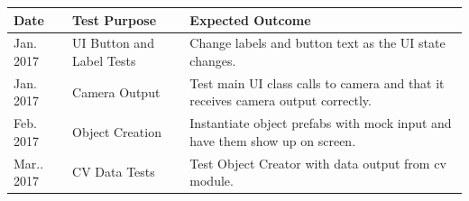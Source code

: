 \documentclass[12pt]{article}
\begin{document}
\begin{longtable}[]{@{}lll@{}}
\toprule
\begin{minipage}[b]{0.06\columnwidth}\raggedright\strut
Date\strut
\end{minipage} & \begin{minipage}[b]{0.16\columnwidth}\raggedright\strut
Test Purpose\strut
\end{minipage} & \begin{minipage}[b]{0.22\columnwidth}\raggedright\strut
Expected Outcome\strut
\end{minipage}\tabularnewline
\midrule
\endhead
\begin{minipage}[t]{0.06\columnwidth}\raggedright\strut
Jan. 2017\strut
\end{minipage} & \begin{minipage}[t]{0.16\columnwidth}\raggedright\strut
UI Button and Label Tests\strut
\end{minipage} & \begin{minipage}[t]{0.22\columnwidth}\raggedright\strut
Change labels and button text as the UI state changes.\strut
\end{minipage}\tabularnewline
\begin{minipage}[t]{0.06\columnwidth}\raggedright\strut
Jan. 2017\strut
\end{minipage} & \begin{minipage}[t]{0.16\columnwidth}\raggedright\strut
Camera Output\strut
\end{minipage} & \begin{minipage}[t]{0.22\columnwidth}\raggedright\strut
Test main UI class calls to camera and that it receives camera output
correctly.\strut
\end{minipage}\tabularnewline
\begin{minipage}[t]{0.06\columnwidth}\raggedright\strut
Feb. 2017\strut
\end{minipage} & \begin{minipage}[t]{0.16\columnwidth}\raggedright\strut
Object Creation\strut
\end{minipage} & \begin{minipage}[t]{0.22\columnwidth}\raggedright\strut
Instantiate object prefabs with mock input and have them show up on
screen.\strut
\end{minipage}\tabularnewline
\begin{minipage}[t]{0.06\columnwidth}\raggedright\strut
Mar.. 2017\strut
\end{minipage} & \begin{minipage}[t]{0.16\columnwidth}\raggedright\strut
CV Data Tests\strut
\end{minipage} & \begin{minipage}[t]{0.22\columnwidth}\raggedright\strut
Test Object Creator with data output from cv module.\strut
\end{minipage}\tabularnewline
\bottomrule
\end{longtable}
\end{document}

